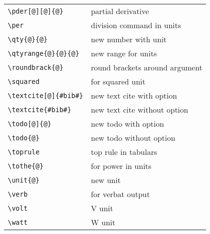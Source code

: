 \begin{longtable}{l p{}}
	\verb+\pder[@][@]{@}+				&	partial derivative						\\
	\verb+\per+							&	division command in units				\\
	\verb+\qty{@}{@}+					&	new number with unit					\\
	\verb+\qtyrange{@}{@}{@}+			&	new range for units						\\
	\verb+\roundbrack{@}+				&	round brackets around argument			\\
	\verb+\squared+						&	for squared unit						\\
	\verb+\textcite[@]{#bib#}+			&	new text cite with option				\\
	\verb+\textcite{#bib#}+				&	new text cite without option			\\
	\verb+\todo[@]{@}+					&	new todo with option					\\
	\verb+\todo{@}+						&	new todo without option					\\
	\verb+\toprule+						&	top rule in tabulars					\\
	\verb+\tothe{@}+					&	for power in units						\\
	\verb+\unit{@}+						&	new unit								\\
	\verb+\verb+						&	for verbat output						\\
	\verb+\volt+						&	\unit{\volt} unit						\\
	\verb+\watt+						&	\unit{\watt} unit						\\
\end{longtable}